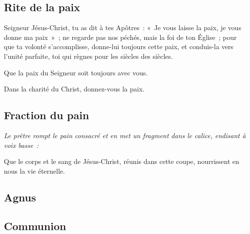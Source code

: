 \subsection{Rite de la paix}

Seigneur Jésus-Christ, tu as dit à tes Apôtres~: «~Je vous laisse la            
paix, je vous donne ma paix~»~; ne regarde pas nos péchés, mais la
foi de ton Église~; pour que ta volonté s'accomplisse, donne-lui
toujours cette paix, et conduis-la vers l'unité parfaite, toi qui
règnes pour les siècles des siècles.


Que la paix du Seigneur soit toujours avec vous.


Dans la charité du Christ, donnez-vous la paix.


\subsection{Fraction du pain}

\emph{Le prêtre rompt le pain consacré et en met un fragment dans le            
calice, endisant à voix basse~:}

Que le corps et le sang de Jésus-Christ, réunis dans cette coupe,
nourrissent en nous la vie éternelle.

\subsection{Agnus}





\subsection{Communion}

